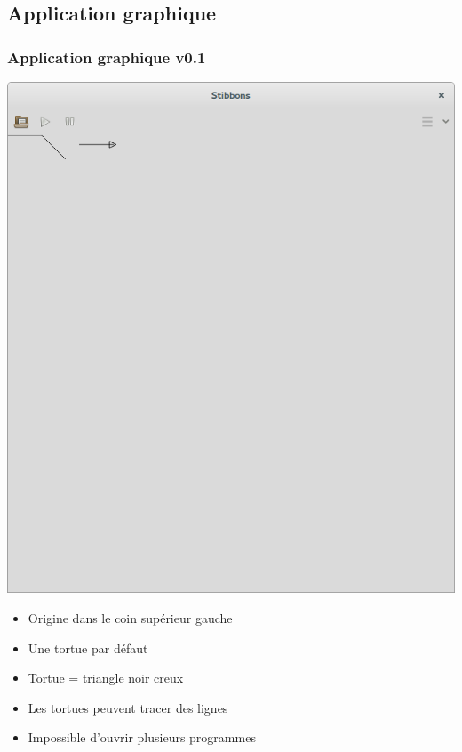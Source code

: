 \subsection{Application graphique}

\begin{frame}
\frametitle{Application graphique v0.1}
\begin{center}
\includegraphics[scale=0.16]{doc/Presentation/screenshot/stibbons-0-1-2.png}
\end{center}

\begin{itemize}
	\item Origine dans le coin supérieur gauche
	\item Une tortue par défaut
	\item Tortue = triangle noir creux
	\item Les tortues peuvent tracer des lignes
	\item Impossible d'ouvrir plusieurs programmes
\end{itemize}
\end{frame}

